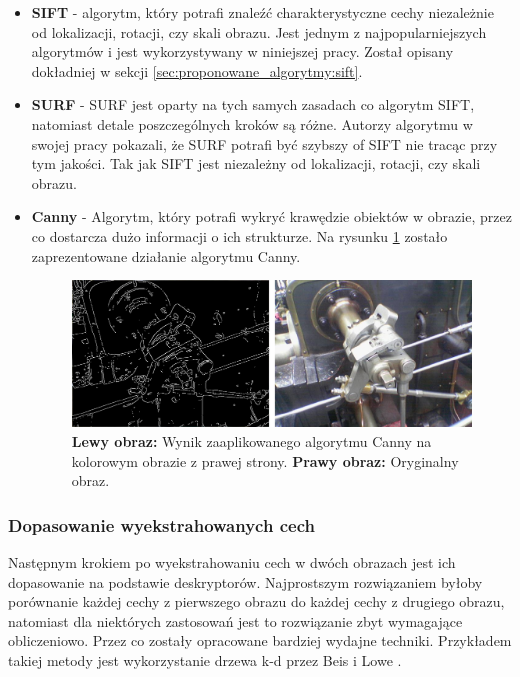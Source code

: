 \begin{itemize}
\item \textbf{SIFT} \cite{Lowe:2004:DIF:993451.996342} - algorytm, który potrafi znaleźć charakterystyczne cechy niezależnie od lokalizacji, rotacji, czy skali obrazu. Jest jednym z najpopularniejszych algorytmów i jest wykorzystywany w niniejszej pracy. Został opisany dokładniej w sekcji \ref{sec:proponowane_algorytmy:sift}.
\item \textbf{SURF} \cite{Bay:2008} - SURF jest oparty na tych samych zasadach co algorytm SIFT, natomiast detale poszczególnych kroków są różne. Autorzy algorytmu w swojej pracy pokazali, że SURF potrafi być szybszy of SIFT nie tracąc przy tym jakości. Tak jak SIFT jest niezależny od lokalizacji, rotacji, czy skali obrazu.
\item \textbf{Canny} \cite{Canny:1986} - Algorytm, który potrafi wykryć krawędzie obiektów w obrazie, przez co dostarcza dużo informacji o ich strukturze. Na rysunku \ref{fig:algorytmy_korejestracji:canny} zostało zaprezentowane działanie algorytmu Canny.

\begin{figure}[H]
  \centering
  \includegraphics[width=\textwidth]{gfx/canny}
  \caption{\textbf{Lewy obraz:} Wynik zaaplikowanego algorytmu Canny na kolorowym obrazie z prawej strony. \textbf{Prawy obraz:} Oryginalny obraz.}
  \label{fig:algorytmy_korejestracji:canny}
\end{figure}

\end{itemize}

\subsubsection{Dopasowanie wyekstrahowanych cech}

Następnym krokiem po wyekstrahowaniu cech w dwóch obrazach jest ich dopasowanie na podstawie deskryptorów. Najprostszym rozwiązaniem byłoby porównanie każdej cechy z pierwszego obrazu do każdej cechy z drugiego obrazu, natomiast dla niektórych zastosowań jest to rozwiązanie zbyt wymagające obliczeniowo. Przez co zostały opracowane bardziej wydajne techniki. Przykładem takiej metody jest wykorzystanie drzewa k-d przez Beis i Lowe \cite{Beis:1997}.

